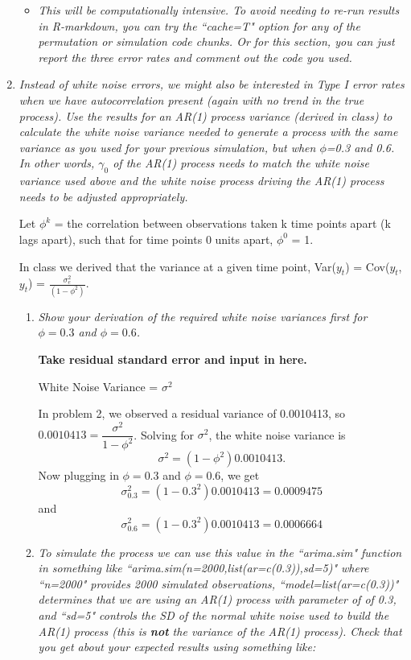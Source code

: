 \documentclass[11pt]{article}\usepackage[]{graphicx}\usepackage[]{color}
\begin{document}
\begin{enumerate}
\begin{itemize}
\item%
{\it This will be computationally intensive. To avoid needing to re-run results in R-markdown, you can try the ``cache=T" option for any of the permutation or simulation code chunks. Or for this section, you can just report the three error rates and comment out the code you used.}

\end{itemize}

\item%
{\it Instead of white noise errors, we might also be interested in Type I error rates when we have autocorrelation present (again with no trend in the true process). Use the results for an AR(1) process variance (derived in class) to calculate the white noise variance needed to generate a process with the same variance as you used for your previous simulation, but when $\phi$=0.3 and 0.6. In other words, $\gamma_0$ of the AR(1) process needs to match the white noise variance used above and the white noise process driving the AR(1) process needs to be adjusted appropriately.}

Let $\phi^{k}$ = the correlation between observations taken k time points apart (k lags apart), such that for time points 0 units apart, $\phi^{0}$ = 1.

In class we derived that the variance at a given time point, Var($y_{t}$) = Cov($y_{t}$,$y_{t}$) = $\frac{\sigma^2_{e}}{(1-\phi^2)}$.


\begin{enumerate}
\item%
{\it Show your derivation of the required white noise variances first for $\phi=0.3$ and $\phi=0.6$.}

{\bf Take residual standard error and input in here.}

White Noise Variance = $\sigma^2$

In problem 2, we observed a residual variance of 0.0010413, so $0.0010413 = \dfrac{\sigma^2}{1-\phi^2}$. Solving for $\sigma^2$, the white noise variance is
$$
\sigma^2 = (1-\phi^2) 0.0010413.
$$
Now plugging in $\phi=0.3$ and $\phi=0.6$, we get
$$\sigma^2_{0.3} = (1-0.3^2) 0.0010413 = 0.0009475$$
and
$$\sigma^2_{0.6} = (1-0.3^2) 0.0010413 = 0.0006664$$

\item%
{\it To simulate the process we can use this value in the ``arima.sim" function in something like ``arima.sim(n=2000,list(ar=c(0.3)),sd=5)" where ``n=2000" provides 2000 simulated observations, ``model=list(ar=c(0.3))" determines that we are using an AR(1) process with parameter of of 0.3, and ``sd=5" controls the SD of the normal white noise used to build the AR(1) process (this is {\bf not} the variance of the AR(1) process). Check that you get about your expected results using something like:}


\end{enumerate}
\end{enumerate}
\end{document}
